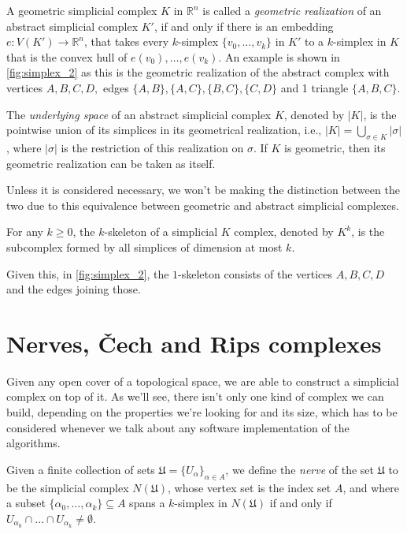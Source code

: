 A geometric simplicial complex $K$ in $\mathbb{R}^{n}$ is called a \textit{geometric realization} of an abstract simplicial complex $K'$, if and only if there is an embedding $e: V(K') \to \mathbb{R}^{n}$, that takes every $k$-simplex $\{v_{0}, \ldots, v_{k}\}$ in $K'$ to a $k$-simplex in $K$ that is the convex hull of $e(v_{0}), \ldots, e(v_{k})$. An example is shown in \ref{fig:simplex_2} as this is the geometric realization of the abstract complex with vertices $A,B,C,D,$ edges $\{A,B\}, \{A,C\}, \{B,C\}, \{C,D\}$ and 1 triangle $\{A,B,C\}$.

\begin{definition}
  The \textit{underlying space} of an abstract simplicial complex $K$, denoted by $|K|$, is the pointwise union of its simplices in its geometrical realization, i.e., $|K| = \bigcup_{\sigma \in K}|\sigma|$, where $|\sigma|$ is the restriction of this realization on $\sigma$. If $K$ is geometric, then its geometric realization can be taken as itself.
\end{definition}

Unless it is considered necessary, we won't be making the distinction between the two due to this equivalence between geometric and abstract simplicial complexes.

\begin{definition}[$k$-skeleton]
  For any $k \geq 0$, the $k$-skeleton of a simplicial $K$ complex, denoted by $K^{k}$, is the subcomplex formed by all simplices of dimension at most $k$.
\end{definition}
Given this, in \ref{fig:simplex_2}, the $1$-skeleton consists of the vertices $A,B,C,D$ and the edges joining those.

\section{Nerves, Čech and Rips complexes}
Given any open cover of a topological space, we are able to construct a simplicial complex on top of it. As we'll see, there isn't only one kind of complex we can build, depending on the properties we're looking for and its size, which has to be considered whenever we talk about any software implementation of the algorithms.

\begin{definition}[Nerve]
  Given a finite collection of sets $\mathfrak{U} = \{U_{\alpha}\}_{\alpha \in A}$, we define the \textit{nerve} of the set $\mathfrak{U}$ to be the simplicial complex $N(\mathfrak{U})$, whose vertex set is the index set $A$, and where a subset $\{\alpha_{0}, \ldots, \alpha_{k}\} \subseteq A$ spans a $k$-simplex in $N(\mathfrak{U})$ if and only if $U_{\alpha_{0}} \cap \ldots \cap U_{\alpha_{k}} \ne \emptyset$.
\end{definition}


